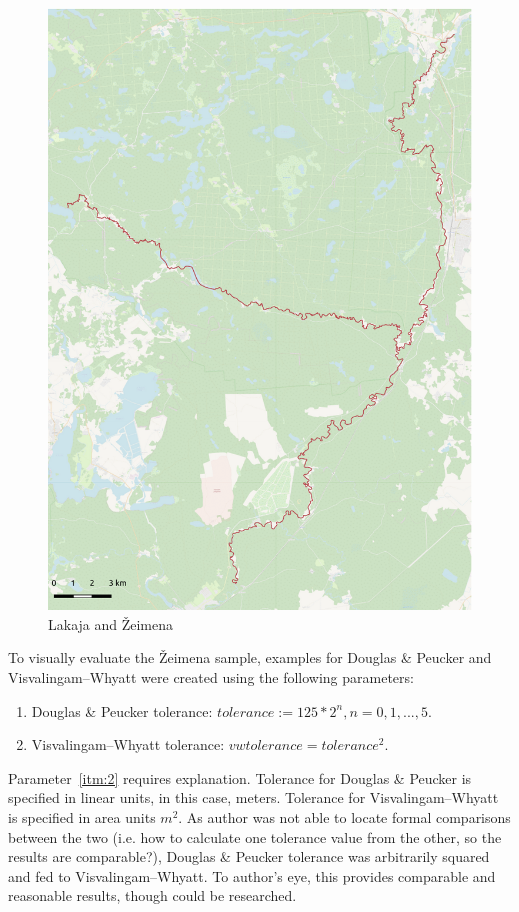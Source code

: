 \documentclass[a4paper]{article}
\newcommand{\DP}{Douglas \& Peucker}
\newcommand{\VW}{Visvalingam--Whyatt}
\begin{document}
\begin{figure}[H]
    \centering
    \includegraphics[width=148mm]{zeimena-pretty}
    \caption{Lakaja and Žeimena}
    \label{fig:zeimena}
\end{figure}

To visually evaluate the Žeimena sample, examples for {\DP} and {\VW}
were created using the following parameters:

\begin{enumerate}[label=(\Roman*)]
    \item {\DP} tolerance: $tolerance := 125 * 2^n, n = 0,1,...,5$.
    \item {\VW} tolerance: $vwtolerance = tolerance ^ 2$\label{itm:2}.
\end{enumerate}

Parameter~\ref{itm:2} requires explanation. Tolerance for {\DP} is specified in
linear units, in this case, meters. Tolerance for {\VW} is specified in area
units $m^2$. As author was not able to locate formal comparisons between the
two (i.e. how to calculate one tolerance value from the other, so the results
are comparable?), {\DP} tolerance was arbitrarily squared and fed to {\VW}. To
author's eye, this provides comparable and reasonable results, though could be
researched.
\end{document}
